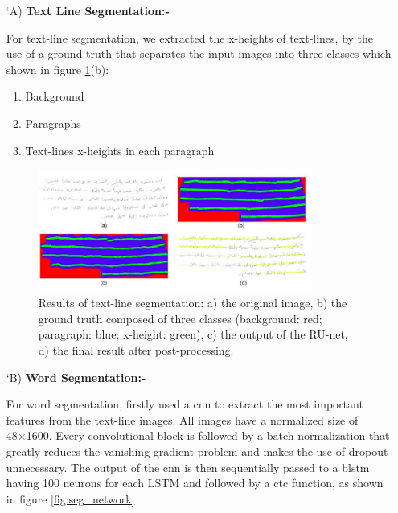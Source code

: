 \begin{itemize}[labelindent=1em,labelsep=0.25cm,leftmargin=*]
         \item[\char `A)] \textbf{Text Line Segmentation:-}
         
        For text-line segmentation, we extracted the x-heights of
        text-lines, by the use of a ground truth that separates the input images into three classes which shown in figure \ref{fig:result_of_line}(b):
        \begin{enumerate}
            \item Background
            \item Paragraphs
            \item Text-lines x-heights in each paragraph
        \end{enumerate}
        
        \begin{figure}[!htb]
            \centering
            \includegraphics[width=9cm]{images/result_of_line.png}
            \caption{Results of text-line segmentation: a) the original image, b) the ground truth composed of three classes (background: red; paragraph: blue; x-height: green), c) the output of the RU-net, d) the final result after post-processing.}
            \label{fig:result_of_line}
        \end{figure}
        
        \item[\char `B)] \textbf{Word Segmentation:-}
        
        For word segmentation, firstly used a \acrshort{cnn} to extract the most important features from the text-line images. All images have a normalized size of 48×1600. Every convolutional block is followed by a batch normalization that greatly reduces the vanishing gradient problem and makes the use of dropout unnecessary. The output of the \acrshort{cnn} is then sequentially passed to a \acrshort{blstm} having 100 neurons for each LSTM and followed by a \acrshort{ctc} function, as shown in figure \ref{fig:seg_network}
        

\end{itemize}
